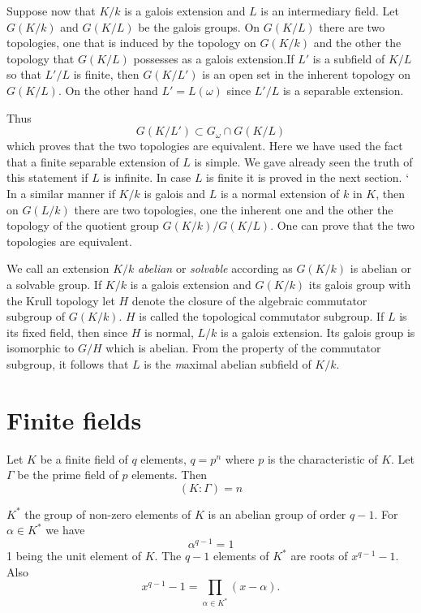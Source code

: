  Suppose now that $K/k$ is a galois extension and $L$ is an
 intermediary field. Let $G(K/k)$ and $G(K/L)$ be the galois
 groups. On $G(K/L)$ there are two topologies, one that is induced by
 the topology on $G(K/k)$ and the other the topology that $G(K/L)$
 possesses as a galois extension.\pageoriginale If $L'$ is a subfield
 of $K/L$ so  that $L' / L$ is finite, then $G(K/L')$ is an open set
 in the  inherent topology on $G(K/L)$. On the other hand $L' =
 L(\omega)$  since $L'/L$ is a separable extension.   
 
 Thus
 $$
 G(K/L') \subset G_{\omega} \cap G(K/L)
 $$
 which proves that the two topologies are equivalent. Here we have
 used the fact that a finite separable extension of $L$ is simple. We
 gave already seen the truth of this statement if $L$ is infinite. In
 case $L$ is finite it is proved in the next section. 
 `
 In a similar manner if $K/k$ is galois and $L$ is a normal extension
 of $k$ in $K$, then on $G(L/k)$ there are two topologies, one the
 inherent one and the other the topology of the quotient group $G(K/k)
 / G(K/L)$. One can prove that the two topologies are equivalent.  
 
 We call an extension $K/k$ \textit{abelian} or \textit{solvable}
 according as $G(K/k)$ is abelian or a solvable group. If $K/k$ is a
 galois 	extension and $G(K/k)$ its galois group with the Krull
 topology let $H$ denote the closure of the algebraic commutator
 subgroup of $G(K/k)$. $H$ is called the topological commutator
 subgroup. If $L$ is its fixed field, then since $H$ is normal, $L/k$
 is a galois extension. Its galois group is isomorphic to $G/H$ which
 is abelian. From the property of the commutator subgroup, it follows
 that $L$ is the  {\textit maximal abelian subfield} of $K/k$. 

\section{Finite fields}\label{c2:s8}%

Let $K$ be a finite field of $q$ elements, $q=p^n$ where $p$ is the
characteristic of $K$. Let $\Gamma$ be the prime field of $p$
elements. Then 
$$
(K:\Gamma )=n
$$

$K^*$ the group of non-zero elements of $K$ is an abelian group of
order $q-1$. For $\alpha \in K^*$ we have 
$$
\alpha^{q-1}=1
$$ 
1 being the unit element of $K$. The $q-1$ elements of $K^*$ are
roots of $x^{q-1}-1$. Also 
$$
x^{q-1}-1=\prod_{\alpha \in K^*}(x-\alpha).
$$

